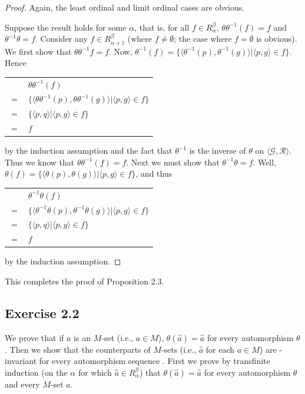 \documentclass{article}
\theoremstyle{definition}
\begin{document}
\begin{proof}

Again, the least ordinal and limit ordinal cases are obvious.

Suppose the result holds for some $\alpha$, that is, for all $f\in R^\mathcal{G}_\alpha$, 
$\theta\theta^{-1}(f)=f$ and $\theta^{-1}\theta=f$. Consider any 
$f\in R^\mathcal{G}_{\alpha+1}$ (where $f\ne\emptyset$; the case where $f=\emptyset$ is obvious). 
We first show that $\theta\theta^{-1}f=f$. Now, 
$\theta^{-1}(f)=\{\langle\theta^{-1}(p),\theta^{-1}(g)\rangle|\langle p,g\rangle\in f\}$. Hence
\begin{center}
\begin{tabular}{ll}
& $\theta\theta^{-1}(f)$ \\
$=$ & $\{\langle\theta\theta^{-1}(p),\theta\theta^{-1}(g)\rangle|\langle p,g\rangle\in f\}$ \\
$=$ & $\{\langle p,q\rangle|\langle p,g\rangle\in f\}$ \\
$=$ & $f$
\end{tabular}
\end{center}
by the induction assumption and the fact that $\theta^{-1}$ is the inverse of $\theta$ on $\langle\mathcal{G},\mathcal{R}\rangle$.
Thus we know that $\theta\theta^{-1}(f)=f$. Next we must show that $\theta^{-1}\theta=f$.
Well, $\theta(f)=\{\langle\theta(p),\theta(g)\rangle|\langle p,g\rangle\in f\}$, and thus
\begin{center}
\begin{tabular}{ll}
& $\theta^{-1}\theta(f)$ \\
$=$ & $\{\langle\theta^{-1}\theta(p),\theta^{-1}\theta(g)\rangle|\langle p,g\rangle\in f\}$ \\
$=$ & $\{\langle p,q\rangle|\langle p,g\rangle\in f\}$ \\
$=$ & $f$
\end{tabular}
\end{center} 
by the induction assumption.

\end{proof}

This completes the proof of Proposition 2.3.

\subsection*{Exercise 2.2}
We prove that if $a$ is an $M$-set (i.e., $a\in M$), $\theta(\hat{a})=\hat{a}$ for every automorphism $\theta$. Then we show that 
the counterparts of $M$-sets (i.e., $\hat{a}$ for each $a\in M$) are -invariant for every automorphism sequence . 
First we prove by transfinite induction (on the $\alpha$ for which $\hat{a}\in R^\mathcal{G}_\alpha$)
that $\theta(\hat{a})=\hat{a}$ for every automorphism $\theta$ and every $M$-set $a$.
\end{document}

